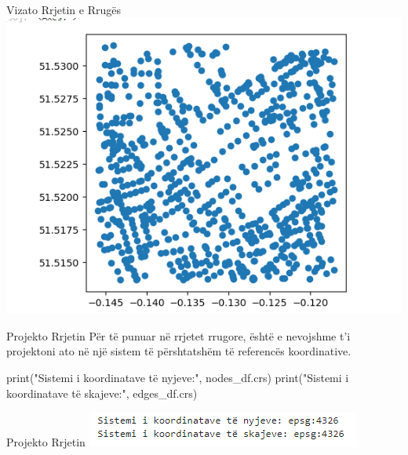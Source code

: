 \documentclass[
  ignorenonframetext,
]{beamer}
\newenvironment{Shaded}{\begin{snugshade}}{\end{snugshade}}
\newcommand{\BuiltInTok}[1]{#1}
\newcommand{\NormalTok}[1]{#1}
\newcommand{\StringTok}[1]{\textcolor[rgb]{0.31,0.60,0.02}{#1}}
\begin{document}
\begin{frame}{Vizato Rrjetin e Rrugës}
\protect\hypertarget{vizato-rrjetin-e-rruguxebs-9}{}
\includegraphics{./Figs/rrjetirrugor1.png}
\end{frame}

\begin{frame}[fragile]{Projekto Rrjetin}
\protect\hypertarget{projekto-rrjetin}{}
Për të punuar në rrjetet rrugore, është e nevojshme t'i projektoni ato
në një sistem të përshtatshëm të referencës koordinative.


\begin{Shaded}
\begin{Highlighting}[]
\BuiltInTok{print}\NormalTok{(}\StringTok{"Sistemi i koordinatave të nyjeve:"}\NormalTok{, nodes\_df.crs)}
\BuiltInTok{print}\NormalTok{(}\StringTok{"Sistemi i koordinatave të skajeve:"}\NormalTok{, edges\_df.crs)}
\end{Highlighting}
\end{Shaded}
\end{frame}

\begin{frame}{Projekto Rrjetin}
\protect\hypertarget{projekto-rrjetin-1}{}
\includegraphics{./Figs/rrjetikor.png}
\end{frame}
\end{document}
